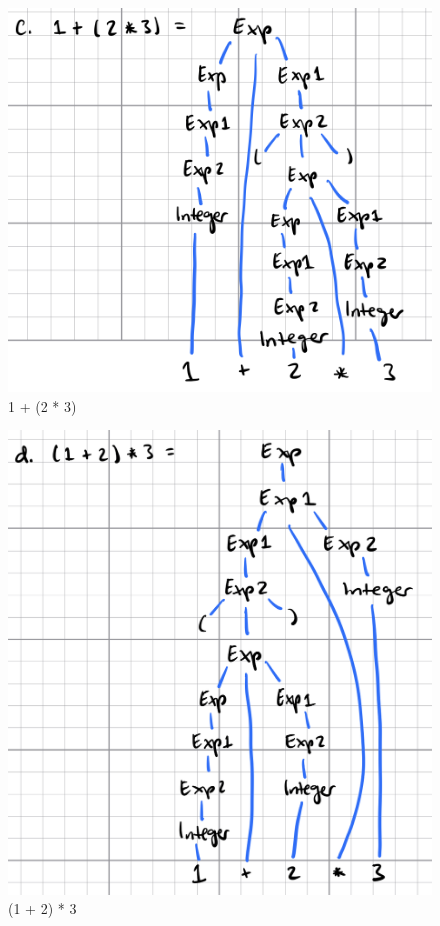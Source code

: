 \documentclass{article}
\theoremstyle{theorem}
\theoremstyle{definition}
\theoremstyle{remark}
\begin{document}
\begin{figure}[H]
\begin{center}
\includegraphics[scale=0.4]{img/C3.png}
\end{center}
\caption{1 + (2 * 3)}\label{C3}
\end{figure}

\begin{figure}[H]
\begin{center}
\includegraphics[scale=0.4]{img/C4.png}
\end{center}
\caption{(1 + 2) * 3}\label{C4}
\end{figure}
\end{document}
